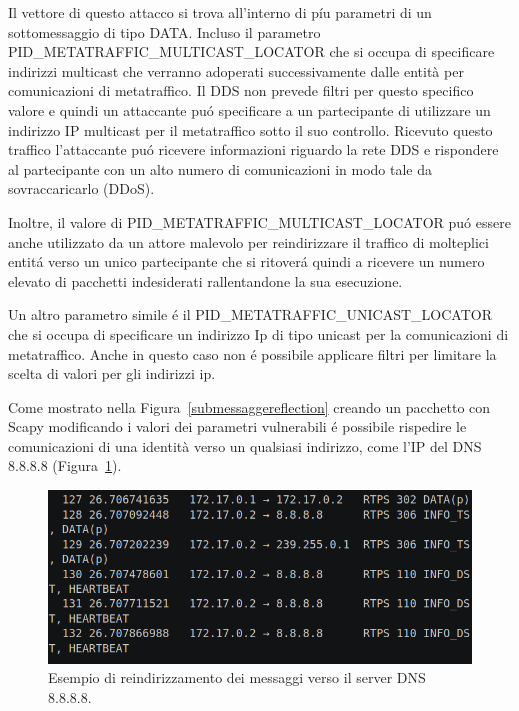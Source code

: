 Il vettore di questo attacco si trova all'interno di píu parametri 
di un sottomessaggio di tipo DATA. 
Incluso il parametro 
PID\_METATRAFFIC\_MULTICAST\_LOCATOR che si occupa di specificare 
indirizzi multicast che verranno adoperati successivamente dalle 
entità per comunicazioni di metatraffico.
Il DDS non prevede filtri per questo 
specifico valore e quindi un attaccante puó specificare a un 
partecipante di utilizzare un indirizzo IP multicast per il metatraffico 
sotto il suo controllo. Ricevuto questo traffico l'attaccante puó 
ricevere informazioni riguardo la rete DDS e rispondere al partecipante
con un alto numero di comunicazioni in modo tale da sovraccaricarlo (DDoS).

Inoltre, il valore 
di PID\_METATRAFFIC\_MULTICAST\_LOCATOR puó essere anche utilizzato 
da un attore malevolo per reindirizzare il traffico di molteplici 
entitá verso un unico partecipante che si ritoverá quindi a ricevere un 
numero elevato di pacchetti indesiderati rallentandone la sua esecuzione.

Un altro parametro simile é il PID\_METATRAFFIC\_UNICAST\_LOCATOR
che si occupa di specificare un indirizzo Ip di tipo unicast 
per la comunicazioni di metatraffico. Anche in questo caso non é
possibile applicare filtri per limitare la scelta di valori per 
gli indirizzi ip. 

Come mostrato nella 
Figura~\ref{submessaggereflection} creando un pacchetto con Scapy
modificando i valori dei parametri vulnerabili 
é possibile 
rispedire le comunicazioni di una identità verso un qualsiasi
indirizzo, come l'IP del DNS 8.8.8.8 (Figura~\ref{reflectionattackdns}).


\begin{figure}[H]
    \centering
    \includegraphics[width=15.2cm, keepaspectratio]{img/reflectionattackdns.png}
    \caption{Esempio di reindirizzamento dei messaggi verso il server DNS 8.8.8.8.}
    \label{reflectionattackdns}
\end{figure}

